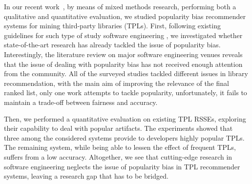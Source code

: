 In our recent work~\cite{10174041}, by means of mixed methods research, \ie performing both a qualitative and quantitative evaluation, we studied popularity bias recommender systems for mining third-party libraries (TPLs). %
First, following existing guidelines for such type of study software engineering \cite{KitchenhamBLBB11}, we investigated whether state-of-the-art research has already tackled the issue of popularity bias. %
Interestingly, the literature review on major software engineering venues reveals that the issue of dealing with popularity bias has not received enough attention from the community. All of the surveyed studies tackled different issues in library recommendation, with the main aim of improving the relevance of the final ranked list, %
only one work attempts to tackle popularity, unfortunately, it fails to maintain a trade-off between fairness and accuracy. %

Then, we performed a quantitative evaluation on \numSys existing TPL RSSEs, exploring their capability to deal with %
popular artifacts. %
The experiments showed that three among the considered systems provide to developers highly popular TPLs. The remaining system, while being able to lessen the effect of frequent TPLs, suffers from a low accuracy. Altogether, we see that cutting-edge research in software engineering neglects the issue of popularity bias in TPL recommender systems, leaving a research gap that has to be %
bridged.

